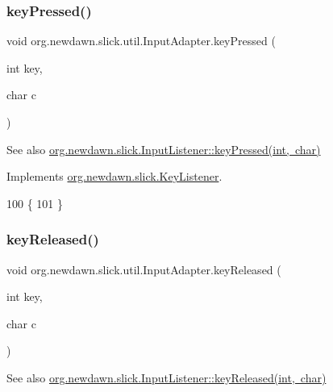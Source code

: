 \subsubsection{\texorpdfstring{key\+Pressed()}{keyPressed()}}
{\footnotesize\ttfamily void org.\+newdawn.\+slick.\+util.\+Input\+Adapter.\+key\+Pressed (\begin{DoxyParamCaption}\item[{int}]{key,  }\item[{char}]{c }\end{DoxyParamCaption})\hspace{0.3cm}{\ttfamily [inline]}}

\begin{DoxySeeAlso}{See also}
\mbox{\hyperlink{interfaceorg_1_1newdawn_1_1slick_1_1_key_listener_ac0b0568a21ef486c4f51382614c196ef}{org.\+newdawn.\+slick.\+Input\+Listener\+::key\+Pressed(int, char)}} 
\end{DoxySeeAlso}


Implements \mbox{\hyperlink{interfaceorg_1_1newdawn_1_1slick_1_1_key_listener_ac0b0568a21ef486c4f51382614c196ef}{org.\+newdawn.\+slick.\+Key\+Listener}}.


\begin{DoxyCode}
100                                             \{
101     \}
\end{DoxyCode}
\mbox{\label{classorg_1_1newdawn_1_1slick_1_1util_1_1_input_adapter_a2b610479cd3d4c0eb61cb4ed83c95764}} 
\subsubsection{\texorpdfstring{key\+Released()}{keyReleased()}}
{\footnotesize\ttfamily void org.\+newdawn.\+slick.\+util.\+Input\+Adapter.\+key\+Released (\begin{DoxyParamCaption}\item[{int}]{key,  }\item[{char}]{c }\end{DoxyParamCaption})\hspace{0.3cm}{\ttfamily [inline]}}

\begin{DoxySeeAlso}{See also}
\mbox{\hyperlink{interfaceorg_1_1newdawn_1_1slick_1_1_key_listener_a474673b59bc77266bcef3c261c26ee2b}{org.\+newdawn.\+slick.\+Input\+Listener\+::key\+Released(int, char)}} 
\end{DoxySeeAlso}


